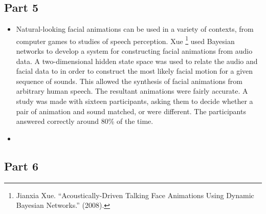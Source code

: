 \documentclass[11pt]{article}
\begin{document}
\subsection*{Part 5}
\begin{itemize}
\item Natural-looking facial animations can be used in a variety of contexts, from computer games to studies of speech perception. Xue \footnote{Jianxia Xue. ``Acoustically-Driven Talking Face Animations Using Dynamic Bayesian Networks.'' (2008).} used Bayesian networks to develop a system for constructing facial animations from audio data. A two-dimensional hidden state space was used to relate the audio and facial data to in order to construct the most likely facial motion for a given sequence of sounds. This allowed the synthesis of facial animations from arbitrary human speech. The resultant animations were fairly accurate. A study was made with sixteen participants, asking them to decide whether a pair of animation and sound matched, or were different. The participants answered correctly around 80\% of the time.
\item
\end{itemize}
\subsection*{Part 6}
\end{document}
